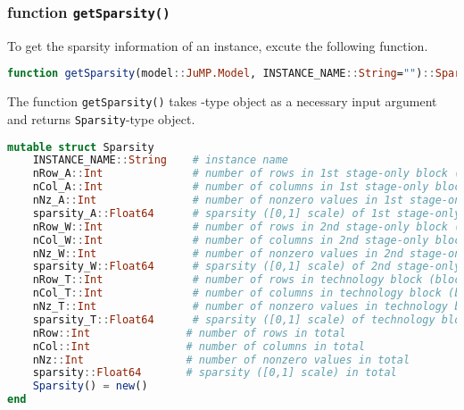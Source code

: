 \subsubsection{function \texttt{getSparsity()}}
To get the sparsity information of an instance, excute the following function.
\begin{lstlisting}[frame=single,language=julia]
function getSparsity(model::JuMP.Model, INSTANCE_NAME::String="")::Sparsity
\end{lstlisting}
The function \texttt{getSparsity()} takes \jumpmodel-type object as a necessary input argument and returns \texttt{Sparsity}-type object.
\begin{lstlisting}[frame=single,language=julia]
mutable struct Sparsity
    INSTANCE_NAME::String    # instance name
	nRow_A::Int              # number of rows in 1st stage-only block (block A)
	nCol_A::Int              # number of columns in 1st stage-only block (block A)
	nNz_A::Int               # number of nonzero values in 1st stage-only block (block A)
	sparsity_A::Float64      # sparsity ([0,1] scale) of 1st stage-only block (block A)
	nRow_W::Int              # number of rows in 2nd stage-only block (block W)
	nCol_W::Int              # number of columns in 2nd stage-only block (block W)
	nNz_W::Int               # number of nonzero values in 2nd stage-only block (block W)
	sparsity_W::Float64      # sparsity ([0,1] scale) of 2nd stage-only block (block W)
	nRow_T::Int              # number of rows in technology block (block T)
	nCol_T::Int              # number of columns in technology block (block T)
	nNz_T::Int               # number of nonzero values in technology block (block T)
	sparsity_T::Float64      # sparsity ([0,1] scale) of technology block (block T)
	nRow::Int               # number of rows in total
	nCol::Int               # number of columns in total
	nNz::Int                # number of nonzero values in total
	sparsity::Float64       # sparsity ([0,1] scale) in total
	Sparsity() = new()
end
\end{lstlisting}

